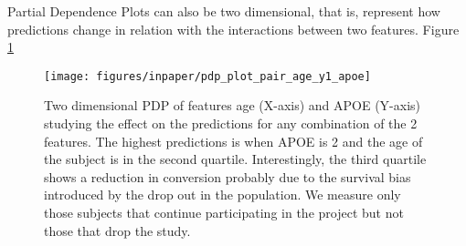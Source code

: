 \documentclass[preprint,12pt]{elsarticle}
\begin{document}
    

Partial Dependence Plots can also be two dimensional, that is, represent how predictions change in relation with the interactions between two features. Figure \ref{fig:PDP-2D}  


\begin{figure}[!htb]
        \centering
        \texttt{[image: figures/inpaper/pdp\_plot\_pair\_age\_y1\_apoe]}
        \caption{Two dimensional PDP of features age (X-axis) and APOE (Y-axis) studying the effect on the predictions for any combination of the 2 features. The highest predictions is when APOE is 2 and the age of the subject is in the second quartile. Interestingly, the third quartile shows a reduction in conversion probably due to the survival bias introduced by the drop out in the population. We measure only those subjects that continue participating in the project but not those that drop the study.} 
        \label{fig:PDP-2D}
\end{figure}
\end{document}

